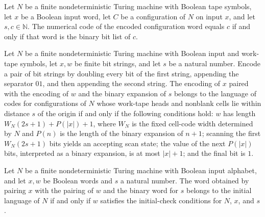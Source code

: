 \begin{lemma}
\label{Complexity.Codec.cfgWord_eq_bits_iff}
\leanok
{}
Let $N$ be a finite nondeterministic Turing machine with Boolean tape symbols, let $x$
be a Boolean input word, let $C$ be a configuration of $N$ on input $x$, and let
$s,c\in\mathbb{N}$. The numerical code of the encoded configuration word equals $c$ if
and only if that word is the binary bit list of $c$.
\end{lemma}

\begin{theorem}
\label{Complexity.Codec.validLang_iff}
\leanok
{}
Let $N$ be a finite nondeterministic Turing machine with Boolean input and work-tape
symbols, let $x,w$ be finite bit strings, and let $s$ be a natural number. Encode a pair
of bit strings by doubling every bit of the first string, appending the separator $01$,
and then appending the second string. The encoding of $x$ paired with the encoding of
$w$ and the binary expansion of $s$ belongs to the language of codes for configurations
of $N$ whose work-tape heads and nonblank cells lie within distance $s$ of the origin if
and only if the following conditions hold: $w$ has length $W_N(2s+1)+P(|x|)+1$, where
$W_N$ is the fixed cell-code width determined by $N$ and $P(n)$ is the length of the
binary expansion of $n+1$; scanning the first $W_N(2s+1)$ bits yields an accepting scan
state; the value of the next $P(|x|)$ bits, interpreted as a binary expansion, is at
most $|x|+1$; and the final bit is $1$.
\end{theorem}

\begin{theorem}
\label{Complexity.Codec.initLang_iff}
\leanok
{}
Let $N$ be a finite nondeterministic Turing machine with Boolean input alphabet, and let
$x,w$ be Boolean words and $s$ a natural number. The word obtained by pairing $x$ with
the pairing of $w$ and the binary word for $s$ belongs to the initial language of $N$ if
and only if $w$ satisfies the initial-check conditions for $N$, $x$, and $s$.
\end{theorem}

